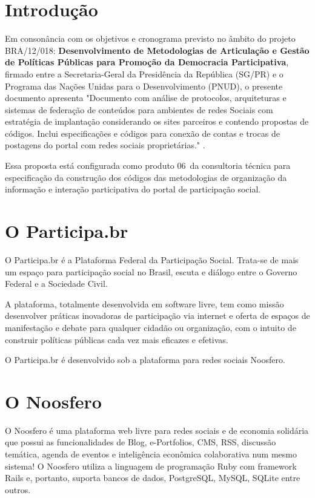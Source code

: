 \documentclass[12pt]{article}
\newcommand{\ProductNumber}{06}
\newcommand{\ProductDescription}{"Documento com análise de protocolos,
  arquiteturas e sistemas de federação de conteúdos para ambientes de redes
  Sociais com estratégia de implantação considerando os sites parceiros e
  contendo propostas de códigos. Inclui especificações e códigos para conexão
  de contas e trocas de postagens do portal com redes sociais proprietárias."
}
\newcommand{\PalavrasChave}{federação, redes sociais, diaspora, descentralização}
\begin{document}




\tableofcontents
\newpage

\begin{abstract}
... \\

{\bf Palavras-chave:} \PalavrasChave.
\end{abstract}
\newpage

\section{Introdução}

Em consonância com os objetivos e cronograma previsto no âmbito do
projeto BRA/12/018:
\textbf{Desenvolvimento de Metodologias de Articulação e Gestão de
Políticas Públicas para Promoção da Democracia Participativa},
firmado entre a Secretaria-Geral da Presidência da República
(SG/PR) e o Programa das Nações Unidas para o Desenvolvimento (PNUD),
o presente documento apresenta \ProductDescription.

Essa proposta está configurada como produto \ProductNumber~da consultoria técnica
para especificação da construção dos códigos das metodologias de
organização da informação e interação participativa do portal de
participação social.

\section{O Participa.br}

O Participa.br é a Plataforma Federal da Participação Social. Trata-se de mais
um espaço para participação social no Brasil, escuta e diálogo entre o Governo
Federal e a Sociedade Civil. 

A plataforma, totalmente desenvolvida em software livre, tem como missão
desenvolver práticas inovadoras de participação via internet e oferta de
espaços de manifestação e debate para qualquer cidadão ou organização, com o
intuito de construir políticas públicas cada vez mais eficazes e efetivas.

O Participa.br é desenvolvido sob a plataforma para redes sociais Noosfero.

\section{O Noosfero}

O Noosfero\cite{noosfero} é uma plataforma web livre para redes sociais e de
economia solidária que possui as funcionalidades de Blog, e-Portfolios, CMS,
RSS, discussão temática, agenda de eventos e inteligência econômica
colaborativa num mesmo sistema! O Noosfero utiliza a linguagem de programação
Ruby com framework Rails e, portanto, suporta bancos de dados, PostgreSQL,
MySQL, SQLite entre outros.
\end{document}
